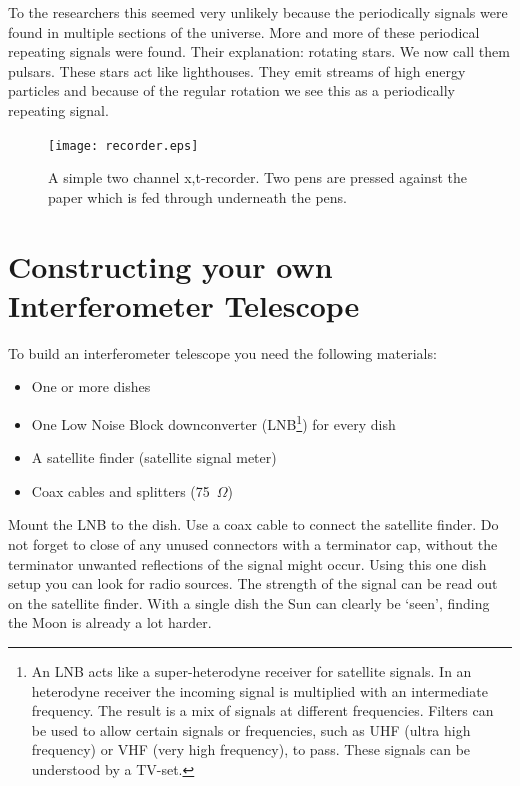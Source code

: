 \documentclass[12pt,a4paper]{article}
\numberwithin{equation}{section}
\numberwithin{figure}{section}
\numberwithin{table}{section}
\begin{document}
To the researchers this seemed very unlikely because the periodically signals were found in multiple sections of the universe. More and more of these periodical repeating signals were found. Their explanation: rotating stars. We now call them pulsars. These stars act like lighthouses. They emit streams of high energy particles and because of the regular rotation we see this as a periodically repeating signal.

\begin{figure}[h]\begin{center}
\texttt{[image: recorder.eps]}%
\caption{A simple two channel x,t-recorder. Two pens are pressed against the paper which is fed through underneath the pens.}\label{fig:recorder}
\end{center}\end{figure}

\section{Constructing your own Interferometer Telescope}
To build an interferometer telescope you need the following materials:
\begin{itemize}
\item One or more dishes
\item One Low Noise Block downconverter (LNB\footnote{An LNB acts like a super-heterodyne receiver for satellite signals. In an heterodyne receiver the incoming signal is multiplied with an intermediate frequency. The result is a mix of signals at different frequencies. Filters can be used to allow certain signals or frequencies, such as UHF (ultra high frequency) or VHF (very high frequency), to pass. These signals can be understood by a TV-set. }) for every dish
\item A satellite finder (satellite signal meter)
\item Coax cables and splitters (75~$\Omega$)
\end{itemize}

Mount the LNB to the dish. Use a coax cable to connect the satellite finder. Do not forget to close of any unused connectors with a terminator cap, without the terminator unwanted reflections of the signal might occur. Using this one dish setup you can look for radio sources. The strength of the signal can be read out on the satellite finder. With a single dish the Sun can clearly be `seen', finding the Moon is already a lot harder.
\end{document}
